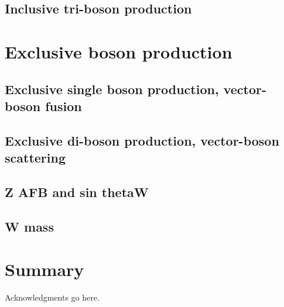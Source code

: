 \documentclass[12pt]{iopart}
\begin{document}




\subsection{Inclusive tri-boson production}


\section{Exclusive boson production}
\subsection{Exclusive single boson production, vector-boson fusion}


\subsection{Exclusive di-boson production, vector-boson scattering}


\subsection{Z AFB and sin thetaW}


\subsection{W mass}

\section{Summary}








\ack
Acknowledgments go here.



\end{document}
